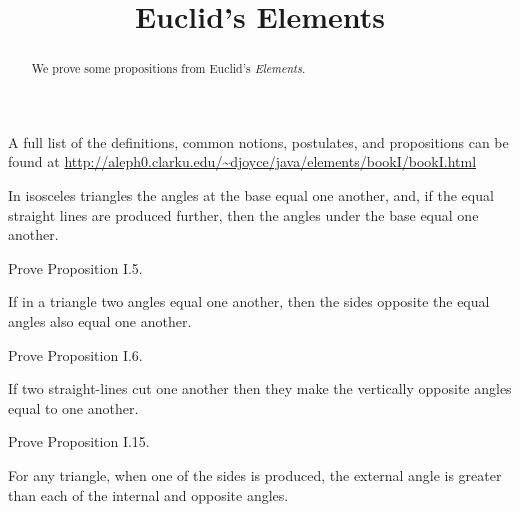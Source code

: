 \documentclass{ximera}
\title{Euclid's Elements}
\begin{document}
\begin{abstract}
We prove some propositions from Euclid's \textit{Elements}. \end{abstract}

\maketitle



A full list of the definitions, common notions, postulates, and propositions can be found at \url{http://aleph0.clarku.edu/~djoyce/java/elements/bookI/bookI.html}


\begin{proposition}[I.5]
In isosceles triangles the angles at the base equal one another, and, if the equal straight lines are produced further, then the angles under the base equal one another.
\end{proposition}

\begin{question}
Prove Proposition I.5.
\end{question}

\begin{proposition}[I.6]
If in a triangle two angles equal one another, then the sides opposite the equal angles also equal one another.
\end{proposition}

\begin{question}
Prove Proposition I.6.
\end{question}


\begin{proposition}[I.15]
If two straight-lines cut one another then they make the vertically
opposite angles equal to one another.
\end{proposition}

\begin{question}
Prove Proposition I.15.
\end{question}

\begin{proposition}[I.16]
For any triangle, when one of the sides is produced, the external
angle is greater than each of the internal and opposite angles.
\begin{image}
\end{image}
\end{proposition}
\end{document}
